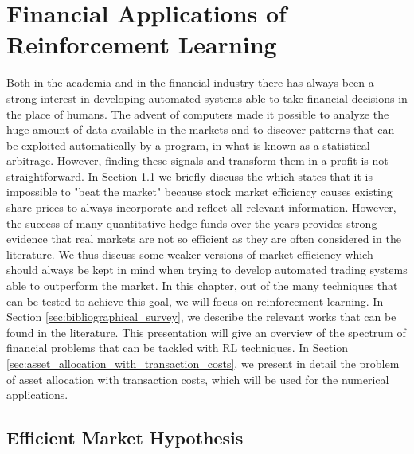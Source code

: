 \chapter{Financial Applications of Reinforcement Learning}
\label{ch:financial_applications_of_reinforcement_learning}

Both in the academia and in the financial industry there has always been a strong interest in developing automated systems able to take financial decisions in the place of humans. The advent of computers made it possible to analyze the huge amount of data available in the markets and to discover patterns that can be exploited automatically by a program, in what is known as a statistical arbitrage. However, finding these signals and transform them in a profit is not straightforward. In Section  \ref{sec:efficient_market_hypothesis} we briefly discuss the  which states that it is impossible to "beat the market" because stock market efficiency causes existing share prices to always incorporate and reflect all relevant information. However, the success of many quantitative hedge-funds over the years provides strong evidence that real markets are not so efficient as they are often considered in the literature. We thus discuss some weaker versions of market efficiency which should always be kept in mind when trying to develop automated trading systems able to outperform the market. In this chapter, out of the many techniques that can be tested to achieve this goal, we will focus on reinforcement learning. In Section \ref{sec:bibliographical_survey}, we describe the relevant works that can be found in the literature. This presentation will give an overview of the spectrum of financial problems that can be tackled with RL techniques. In Section \ref{sec:asset_allocation_with_transaction_costs}, we present in detail the problem of asset allocation with transaction costs, which will be used for the numerical applications.

\section{Efficient Market Hypothesis}  
\label{sec:efficient_market_hypothesis}

